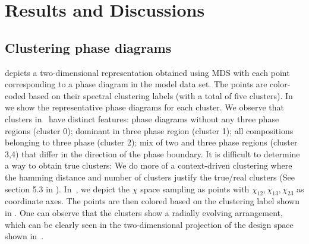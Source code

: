 \section{Results and Discussions}\label{sec:results}
\subsection{Clustering phase diagrams}\label{sec:res:ct1}
 depicts a two-dimensional representation obtained using MDS with each point corresponding to a phase diagram in the model data set. 
The points are color-coded based on their spectral clustering labels (with a total of five clusters).
In  we show the representative phase diagrams for each cluster. 
We observe that clusters in~ have distinct features: phase diagrams without any three phase regions (cluster 0); dominant in three phase region (cluster 1); all compositions belonging to three phase (cluster 2); mix of two and three phase regions (cluster 3,4) that differ in the direction of the phase boundary.
It is difficult to determine a way to obtain true clusters: We do more of a context-driven clustering where the hamming distance and number of clusters justify the true/real clusters (See section 5.3 in \cite{TrueClusters}).
In~, we depict the \(\chi\) space sampling as points with \(\chi_{12},\chi_{13}, \chi_{23}\) as coordinate axes. 
The points are then colored based on the clustering label shown in .
One can observe that the clusters show a radially evolving arrangement, which can be clearly seen in the two-dimensional projection of the design space shown in~.

